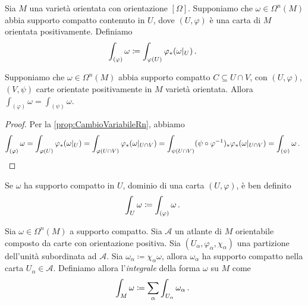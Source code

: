 \begin{definition}
	Sia $M$ una varietà orientata con orientazione $[\Omega]$. Supponiamo che $\omega \in \Omega^n(M)$ abbia supporto compatto contenuto in $U$, dove $(U,\varphi)$ è una carta di $M$ orientata positivamente.
	Definiamo
	\begin{equation*}
		\int_{(\varphi)} \omega \coloneqq \int_{\varphi(U)} \varphi_*(\omega |_ U) \, \text{. }
	\end{equation*}
\end{definition}

\begin{proposition}
	Supponiamo che $\omega\in \Omega^n(M)$ abbia supporto compatto $C\subseteq U\cap V$, con $(U,\varphi)$, $(V,\psi)$ carte orientate positivamente in $M$ varietà orientata.
	Allora $\int_{(\varphi)} \omega = \int_{(\psi)} \omega$.
\end{proposition}
\begin{proof}
	Per la \cref{prop:CambioVariabileRn}, abbiamo
	\begin{equation*}
		\int_{(\varphi)} \omega = \int_{\varphi(U)} \varphi_*(\omega|_ U) = \int_{\varphi(U\cap V)} \varphi_*(\omega|_ {U\cap V}) =\int_{\psi(U\cap V)} (\psi\circ \varphi^{-1})_* \varphi_*(\omega |_ {U\cap V}) = \int_{(\psi)} \omega \, \text{. }
	\end{equation*}
\end{proof}

\begin{corollary}
	Se $\omega$ ha supporto compatto in $U$, dominio di una carta $(U,\varphi)$, è ben definito
	\begin{equation*}
		\int_U \omega \coloneqq \int_{(\varphi)} \omega \, \text{. }
	\end{equation*}
\end{corollary}


\begin{definition}  \label{def:IntegraleForma}
	Sia $\omega \in \Omega^n(M)$ a supporto compatto. Sia $\mathcal A$ un atlante di $M$ orientabile composto da carte con orientazione positiva. Sia $(U_\alpha, \varphi_\alpha, \chi_\alpha)$ una partizione dell'unità subordinata ad $\mathcal A$. Sia $\omega_\alpha \coloneqq \chi_\alpha\omega$, allora $\omega_\alpha$ ha supporto compatto nella carta $U_\alpha\in\mathcal A$.
	Definiamo allora l'\emph{integrale} della forma $\omega$ su $M$ come
	\begin{equation*}
		\int_M \omega \coloneqq \sum_\alpha \int_{U_\alpha} \omega_\alpha \, \text{. }
	\end{equation*}
\end{definition}

